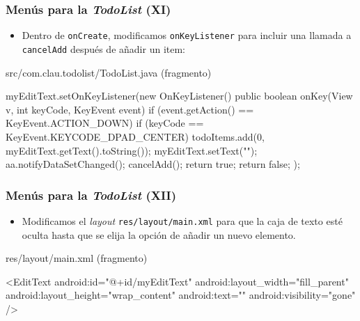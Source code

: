 \documentclass[hyperref={pdfpagelabels=true},ucs]{beamer}
\begin{document}
\begin{frame}[fragile]
\frametitle{Menús para la \emph{TodoList} (XI)}

\begin{itemize}
\item Dentro de \verb|onCreate|, modificamos \verb|onKeyListener| para
  incluir una llamada a \verb|cancelAdd| después de añadir un item:
\end{itemize}

\begin{tiny}
\begin{block}{src/com.clau.todolist/TodoList.java (fragmento)}
\begin{java}
myEditText.setOnKeyListener(new OnKeyListener() {
  public boolean onKey(View v, int keyCode, KeyEvent event) {
    if (event.getAction() == KeyEvent.ACTION_DOWN)
      if (keyCode == KeyEvent.KEYCODE_DPAD_CENTER)
      {
        todoItems.add(0, myEditText.getText().toString());
        myEditText.setText("");
        aa.notifyDataSetChanged();
        cancelAdd();
        return true;
      }
    return false;
  }
});
\end{java}
\end{block}
\end{tiny}

\end{frame}


\begin{frame}[fragile]
\frametitle{Menús para la \emph{TodoList} (XII)}

\begin{itemize}
\item Modificamos el \emph{layout} \verb|res/layout/main.xml| para que
  la caja de texto esté oculta hasta que se elija la opción de
  añadir un nuevo elemento.
\end{itemize}

\begin{tiny}
\begin{block}{res/layout/main.xml (fragmento)}
\begin{xml}
<EditText
   android:id="@+id/myEditText"
   android:layout_width="fill_parent"
   android:layout_height="wrap_content"
   android:text=""
   android:visibility="gone"
/>
\end{xml}
\end{block}
\end{tiny}

\end{frame}
\end{document}
